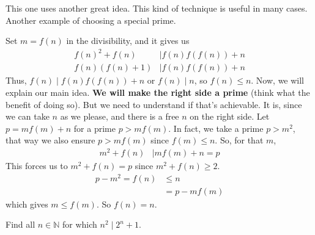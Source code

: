 \documentclass[problems.tex]{subfile}
\begin{document}
	\begin{solution}[Second]
		This one uses another great idea. This kind of technique is useful in many cases. Another example of choosing a special prime.

		Set $m=f(n)$ in the divisibility, and it gives us
		\begin{align*}
		f(n)^2+f(n) & \mid f(n)f(f(n))+n\\
		f(n)(f(n)+1)& \mid  f(n)f(f(n))+n
		\end{align*}
		Thus, $f(n)\mid f(n)f(f(n))+n$ or $f(n)\mid n$, so $f(n)\leq n$. Now, we will explain our main idea. \textbf{We will make the right side a prime} (think what the benefit of doing so). But we need to understand if that's achievable. It is, since we can take $n$ as we please, and there is a free $n$ on the right side. Let $p=mf(m)+n$ for a prime $p>mf(m)$. In fact, we take a prime $p>m^2$, that way we also ensure $p>mf(m)$ since $f(m)\leq n$. So, for that $m$,
			\begin{align*}
				m^2+f(n) & \mid mf(m)+n=p
			\end{align*}
		This forces us to $m^2+f(n)=p$ since $m^2+f(n)\geq2$.
			\begin{align*}
				p-m^2 = f(n) & \leq n\\
							 & = p-mf(m)
			\end{align*}
		which gives $m\leq f(m)$. So $f(n)=n$.
	\end{solution}

	\begin{problem}
		Find all $n\in\mathbb{N}$ for which $n^2\mid 2^n+1$.
	\end{problem}
\end{document}
